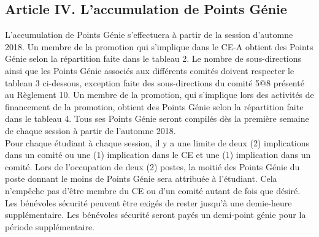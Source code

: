\subsection*{Article IV. L'accumulation de Points Génie}
L’accumulation de Points Génie s'effectuera à partir de la session d'automne 2018. Un membre de la promotion qui s'implique dans le CE-A obtient des Points Génie selon la répartition faite dans le tableau 2. Le nombre de sous-directions ainsi que les Points Génie associés aux différents comités doivent respecter le tableau 3 ci-dessous, exception faite des sous-directions du comité 5@8 présenté au Règlement 10. Un membre de la promotion, qui s’implique lors des activités de financement de la promotion, obtient des Points Génie selon la répartition faite dans le tableau 4. Tous ses Points Génie seront compilés dès la première semaine de chaque session à partir de l'automne 2018. \\

Pour chaque étudiant à chaque session, il y a une limite de deux (2) implications dans un comité ou une (1) implication dans le CE et une (1) implication dans un comité. Lors de l’occupation de deux (2) postes, la moitié des Points Génie du poste donnant le moins de Points Génie sera attribuée à l’étudiant. Cela n'empêche pas d'être membre du CE ou d'un comité autant de fois que désiré. Les bénévoles sécurité peuvent être exigés de rester jusqu’à une demie-heure supplémentaire. Les bénévoles sécurité seront payés un demi-point génie pour la période supplémentaire.

